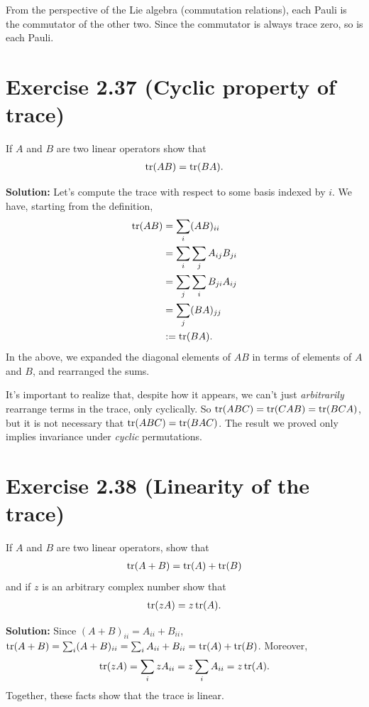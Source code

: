 \documentclass{book}
\begin{document}
    From the perspective of the Lie algebra (commutation relations), each Pauli is the commutator of the other two. Since the commutator is always trace zero, so is each Pauli. 

\section*{Exercise 2.37 (Cyclic property of trace)}
    If $A$ and $B$ are two linear operators show that
    \begin{align}
        \tr(AB) = \tr(BA). 
    \end{align}
    
    \textbf{Solution:} Let's compute the trace with respect to some basis indexed by $i$. We have, starting from the definition,
    \begin{align}
    \begin{aligned}
        \tr(AB) &= \sum_{i} (AB)_{ii} \\
        &= \sum_{i}\sum_{j} A_{ij} B_{ji} \\
        &= \sum_{j} \sum_{i}B_{ji} A_{ij} \\
        &= \sum_{j} (BA)_{jj} \\
        &:= \tr(BA).
    \end{aligned}
    \end{align}
    In the above, we expanded the diagonal elements of $AB$ in terms of elements of $A$ and $B$, and rearranged the sums. 
    
    It's important to realize that, despite how it appears, we can't just \emph{arbitrarily} rearrange terms in the trace, only cyclically. So $\tr(ABC) = \tr(CAB) = \tr(BCA)$, but it is not necessary that $\tr(ABC) = \tr(BAC)$. The result we proved only implies invariance under \emph{cyclic} permutations.

\section*{Exercise 2.38 (Linearity of the trace)}
    If $A$ and $B$ are two linear operators, show that
    \begin{align}
        \tr(A+B) = \tr(A) + \tr(B)
    \end{align}
    and if $z$ is an arbitrary complex number show that 
    \begin{align}
        \tr(z A) = z \tr(A).
    \end{align}
    
    \textbf{Solution:} Since $(A+B)_{ii} = A_{ii} + B_{ii}$, $\tr(A+B) = \sum_i (A+B)_{ii} = \sum_i A_{ii} + B_{ii} = \tr(A) + \tr(B)$. Moreover,
    \begin{align}
        \tr(z A) = \sum_i z A_{ii} = z \sum_i A_{ii} = z\tr(A).
    \end{align}
    Together, these facts show that the trace is linear.
    
\end{document}
